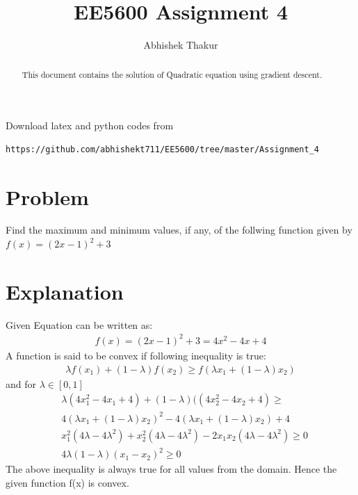 \documentclass[journal,12pt,twocolumn]{IEEEtran}
\begin{document}
     \def\rightbox#1{\makebox[0in][r]{#1}}
     \def\centbox#1{\makebox[0in]{#1}}
     \def\topbox#1{\raisebox{-\baselineskip}[0in][0in]{#1}}
     \def\midbox#1{\raisebox{-0.5\baselineskip}[0in][0in]{#1}}
\vspace{3cm}
\title{EE5600 Assignment 4}
\author{Abhishek Thakur}
\maketitle
\newpage
\bigskip
\renewcommand{\thefigure}{\theenumi}
\renewcommand{\thetable}{\theenumi}
\newcommand\hlight[1]{\tikz[overlay, remember picture,baseline=-\the\dimexpr\fontdimen22\textfont2\relax]\node[rectangle,fill=blue!50,rounded corners,fill opacity = 0.2,draw,thick,text opacity =1] {$#1$};}
\begin{abstract}
This document contains the solution of Quadratic equation using gradient descent.
\end{abstract}
Download latex and python codes from 
\begin{lstlisting}
https://github.com/abhishekt711/EE5600/tree/master/Assignment_4
\end{lstlisting}
%
\section{Problem}
Find the maximum and minimum values, if any, of the follwing function given by\\
    $f(x)=(2x-1)^2+3$
\section{Explanation}
Given Equation can be written as:
\begin{align}
    f(x)=(2x-1)^2+3=4x^2-4x+4
\end{align}
   A function is said to be convex if following inequality is true:
    \begin{align}
        \lambda f(x_1)+(1-\lambda) f(x_2) \geq f(\lambda x_1+(1-\lambda) x_2)
    \end{align}
    and for $\lambda \in [0,1]$
\begin{align}
&\lambda(4x_1^2-4x_1+4)+(1-\lambda)((4x_2^2-4x_2+4) \geq \nonumber \\ 
&4(\lambda x_1 +(1-\lambda )x_2)^2-4(\lambda x_1 +(1-\lambda )x_2)+4\\
&x_1^2(4\lambda-4\lambda^2)+x_2^2(4\lambda-4\lambda^2)-2x_1x_2(4\lambda-4\lambda^2) \geq 0\\
&4\lambda(1-\lambda)(x_1-x_2)^2 \geq 0
\end{align}
The above inequality is always true for all values from the domain. Hence the given function f(x) is convex.
\end{document}
